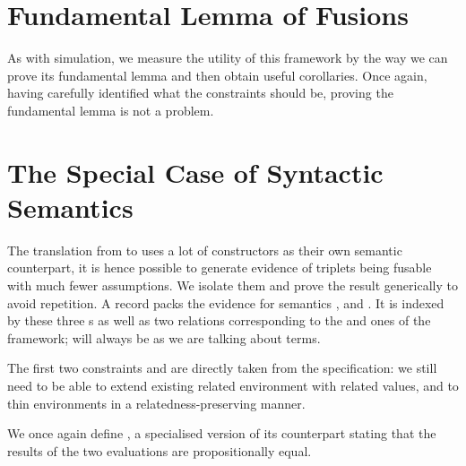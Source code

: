 
\section{Fundamental Lemma of Fusions}

As with simulation, we measure the utility of this framework by the way we can
prove its fundamental lemma and then obtain useful corollaries. Once again,
having carefully identified what the constraints should be, proving the fundamental
lemma is not a problem.


\section{The Special Case of Syntactic Semantics}

The translation from  to  uses a lot of constructors
as their own semantic counterpart, it is hence possible to generate evidence of
 triplets being fusable with much fewer assumptions. We isolate
them and prove the result generically to avoid repetition. A 
record packs the evidence for  semantics ,  and
. It is indexed by these three s as well as two relations
corresponding to the  and  ones of the  framework;
 will always be  as we are talking about terms.


The first two constraints  and  are directly taken
from the  specification: we still need to be able to extend existing related
environment with related values, and to thin environments in a relatedness-preserving manner.


We once again define , a specialised version of its  counterpart
stating that the results of the two evaluations are propositionally equal.


